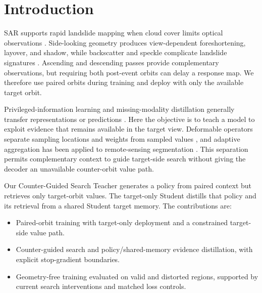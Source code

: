 \section{Introduction}
\label{sec:introduction}
SAR supports rapid landslide mapping when cloud cover limits optical observations \cite{Mondini2021,Handwerger2022,Amatya2023}. Side-looking geometry produces view-dependent foreshortening, layover, and shadow, while backscatter and speckle complicate landslide signatures \cite{Shi2024,Santangelo2022}. Ascending and descending passes provide complementary observations, but requiring both post-event orbits can delay a response map. We therefore use paired orbits during training and deploy with only the available target orbit.

Privileged-information learning and missing-modality distillation generally transfer representations or predictions \cite{LopezPaz2016,Li2022,Liu2024}. Here the objective is to teach a model to exploit evidence that remains available in the target view. Deformable operators separate sampling locations and weights from sampled values \cite{Dai2017,Zhu2021}, and adaptive aggregation has been applied to remote-sensing segmentation \cite{Zuo2022,Dai2023}. This separation permits complementary context to guide target-side search without giving the decoder an unavailable counter-orbit value path.

Our Counter-Guided Search Teacher generates a policy from paired context but retrieves only target-orbit values. The target-only Student distills that policy and its retrieval from a shared Student target memory. The contributions are:
\begin{itemize}
\item Paired-orbit training with target-only deployment and a constrained target-side value path.
\item Counter-guided search and policy/shared-memory evidence distillation, with explicit stop-gradient boundaries.
\item Geometry-free training evaluated on valid and distorted regions, supported by current search interventions and matched loss controls.
\end{itemize}
